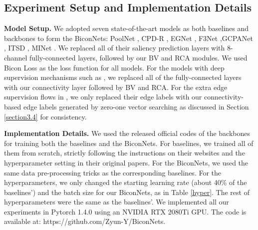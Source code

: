 \documentclass[final]{cvpr}
\begin{document}

\subsection{Experiment Setup and Implementation Details}
\textbf{Model Setup.} We adopted seven state-of-the-art models as both baselines and backbones to form the BiconNets: PoolNet \cite{poolnet}, CPD-R \cite{cpd}, EGNet \cite{egnet}, F3Net \cite{f3net} ,GCPANet \cite{gcpa}, ITSD \cite{ITSD}, MINet \cite{MINet}. We replaced all of their saliency prediction layers with 8-channel fully-connected layers, followed by our BV and RCA modules. We used Bicon Loss as the loss function for all models. For the models with deep supervision mechanisms such as \cite{egnet,gcpa}, we replaced all of the fully-connected layers with our connectivity layer followed by BV and RCA. For the extra edge supervision flows in \cite{egnet,ITSD}, we only replaced their edge labels with our connectivity-based edge labels generated by zero-one vector searching as discussed in Section \ref{section3.4} for consistency.

\textbf{Implementation Details.} We used the released official codes of the backbones for training both the baselines and the BiconNets. For baselines, we trained all of them from scratch, strictly following the instructions on their websites and the hyperparameter setting in their original papers. For the BiconNets, we used the same data pre-processing tricks as the corresponding baselines. For the hyperparameters, we only changed the starting learning rate (about 40\% of the baselines') and the batch size for our BiconNets, as in Table \ref{hyper}. The rest of hyperparameters were the same as the baselines’. We implemented all our experiments in Pytorch 1.4.0 \cite{pytorch} using an NVIDIA RTX 2080Ti GPU. The code is available at: https://github.com/Zyun-Y/BiconNets.
\end{document}
